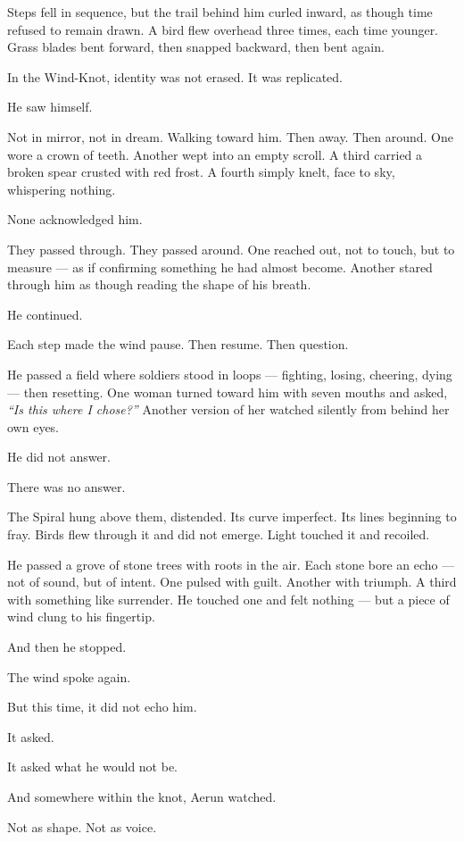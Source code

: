 \documentclass[9pt]{article}
\begin{document}
Steps fell in sequence, but the trail behind him curled inward, as though time refused to remain drawn. A bird flew overhead three times, each time younger. Grass blades bent forward, then snapped backward, then bent again.

In the Wind-Knot, identity was not erased. It was replicated.

He saw himself.

Not in mirror, not in dream. Walking toward him. Then away. Then around. One wore a crown of teeth. Another wept into an empty scroll. A third carried a broken spear crusted with red frost. A fourth simply knelt, face to sky, whispering nothing.

None acknowledged him.

They passed through. They passed around. One reached out, not to touch, but to measure — as if confirming something he had almost become. Another stared through him as though reading the shape of his breath.

He continued.

Each step made the wind pause. Then resume. Then question.

He passed a field where soldiers stood in loops — fighting, losing, cheering, dying — then resetting. One woman turned toward him with seven mouths and asked, \textit{``Is this where I chose?''} Another version of her watched silently from behind her own eyes.

He did not answer.

There was no answer.

The Spiral hung above them, distended. Its curve imperfect. Its lines beginning to fray. Birds flew through it and did not emerge. Light touched it and recoiled.

He passed a grove of stone trees with roots in the air. Each stone bore an echo — not of sound, but of intent. One pulsed with guilt. Another with triumph. A third with something like surrender. He touched one and felt nothing — but a piece of wind clung to his fingertip.

And then he stopped.

The wind spoke again.

But this time, it did not echo him.

It asked.

It asked what he would not be.

And somewhere within the knot, Aerun watched.

Not as shape. Not as voice.
\end{document}
